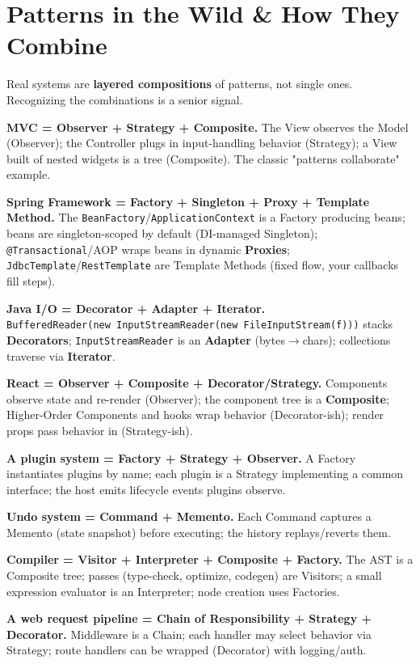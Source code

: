 \documentclass[11pt]{article}
\begin{document}
\section{Patterns in the Wild \& How They Combine}\label{patterns-in-the-wild--how-they-combine}

Real systems are \textbf{layered compositions} of patterns, not single ones. Recognizing the combinations is a senior signal.

\textbf{MVC = Observer + Strategy + Composite.} The View observes the Model (Observer); the Controller plugs in input-handling behavior (Strategy); a View built of nested widgets is a tree (Composite). The classic "patterns collaborate" example.

\textbf{Spring Framework = Factory + Singleton + Proxy + Template Method.} The \texttt{BeanFactory}/\texttt{ApplicationContext} is a Factory producing beans; beans are singleton-scoped by default (DI-managed Singleton); \texttt{@Transactional}/AOP wraps beans in dynamic \textbf{Proxies}; \texttt{JdbcTemplate}/\texttt{RestTemplate} are Template Methods (fixed flow, your callbacks fill steps).

\textbf{Java I/O = Decorator + Adapter + Iterator.} \texttt{BufferedReader(new\ InputStreamReader(new\ FileInputStream(f)))} stacks \textbf{Decorators}; \texttt{InputStreamReader} is an \textbf{Adapter} (bytes\(\rightarrow\)chars); collections traverse via \textbf{Iterator}.

\textbf{React = Observer + Composite + Decorator/Strategy.} Components observe state and re-render (Observer); the component tree is a \textbf{Composite}; Higher-Order Components and hooks wrap behavior (Decorator-ish); render props pass behavior in (Strategy-ish).

\textbf{A plugin system = Factory + Strategy + Observer.} A Factory instantiates plugins by name; each plugin is a Strategy implementing a common interface; the host emits lifecycle events plugins observe.

\textbf{Undo system = Command + Memento.} Each Command captures a Memento (state snapshot) before executing; the history replays/reverts them.

\textbf{Compiler = Visitor + Interpreter + Composite + Factory.} The AST is a Composite tree; passes (type-check, optimize, codegen) are Visitors; a small expression evaluator is an Interpreter; node creation uses Factories.

\textbf{A web request pipeline = Chain of Responsibility + Strategy + Decorator.} Middleware is a Chain; each handler may select behavior via Strategy; route handlers can be wrapped (Decorator) with logging/auth.
\end{document}
